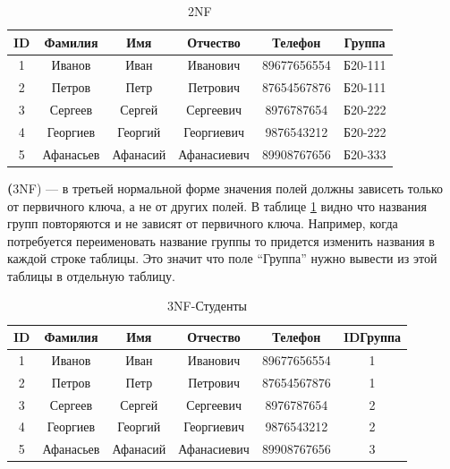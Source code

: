 \documentclass[a4paper]{article}
\begin{document}
\begin{table}[h]
      \caption{2NF}
      \begin{center}\label{tab:2NFDONE}
      \begin{tabular}{|c|c|c|c|c|c|}
        \hline
        ID & Фамилия & Имя & Отчество & Телефон & Группа\\
        \hline
        1 & Иванов & Иван & Иванович & 89677656554 & Б20-111\\
        2 & Петров & Петр & Петрович & 87654567876 & Б20-111\\
        3 & Сергеев & Сергей & Сергеевич & 8976787654 & Б20-222\\
        4 & Георгиев & Георгий & Георгиевич & 9876543212 & Б20-222\\
        5 & Афанасьев & Афанасий & Афанасиевич & 89908767656 & Б20-333\\
        \hline
      \end{tabular}
    \end{center}
  \end{table}

  \noindent \textbf(3NF) --- в третьей нормальной форме значения полей должны зависеть только от первичного ключа, а не от других полей. В таблице \ref{tab:2NFDONE} видно что названия групп повторяются и не зависят от первичного ключа. Например, когда потребуется переименовать название группы то придется изменить названия в каждой строке таблицы. Это значит что поле ``Группа'' нужно вывести из этой таблицы в отдельную таблицу.

  \begin{table}[h]
      \caption{3NF-Студенты}
      \begin{center}\label{tab:3NFDONE_STUDENTS}
      \begin{tabular}{|c|c|c|c|c|c|}
        \hline
        ID & Фамилия & Имя & Отчество & Телефон & IDГруппа\\
        \hline
        1 & Иванов & Иван & Иванович & 89677656554 & 1\\
        2 & Петров & Петр & Петрович & 87654567876 & 1\\
        3 & Сергеев & Сергей & Сергеевич & 8976787654 & 2\\
        4 & Георгиев & Георгий & Георгиевич & 9876543212 & 2\\
        5 & Афанасьев & Афанасий & Афанасиевич & 89908767656 & 3\\
        \hline
      \end{tabular}
    \end{center}
  \end{table}
\end{document}
